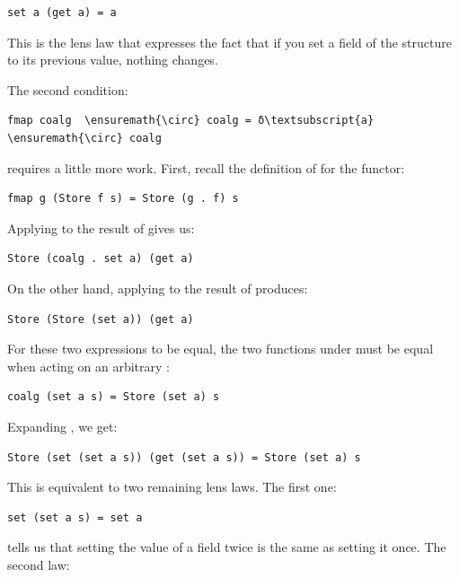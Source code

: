 \begin{Verbatim}[commandchars=\\\{\}]
set a (get a) = a
\end{Verbatim}
This is the lens law that expresses the fact that if you set a field of
the structure  to its previous value, nothing changes.

The second condition:

\begin{Verbatim}[commandchars=\\\{\}]
fmap coalg  \ensuremath{\circ} coalg = δ\textsubscript{a}  \ensuremath{\circ} coalg
\end{Verbatim}
requires a little more work. First, recall the definition of
 for the  functor:

\begin{Verbatim}[commandchars=\\\{\}]
fmap g (Store f s) = Store (g . f) s
\end{Verbatim}
Applying  to the result of  gives us:

\begin{Verbatim}[commandchars=\\\{\}]
Store (coalg . set a) (get a)
\end{Verbatim}
On the other hand, applying  to the result of
 produces:

\begin{Verbatim}[commandchars=\\\{\}]
Store (Store (set a)) (get a)
\end{Verbatim}
For these two expressions to be equal, the two functions under
 must be equal when acting on an arbitrary :

\begin{Verbatim}[commandchars=\\\{\}]
coalg (set a s) = Store (set a) s
\end{Verbatim}
Expanding , we get:

\begin{Verbatim}[commandchars=\\\{\}]
Store (set (set a s)) (get (set a s)) = Store (set a) s
\end{Verbatim}
This is equivalent to two remaining lens laws. The first one:

\begin{Verbatim}[commandchars=\\\{\}]
set (set a s) = set a
\end{Verbatim}
tells us that setting the value of a field twice is the same as setting
it once. The second law:

